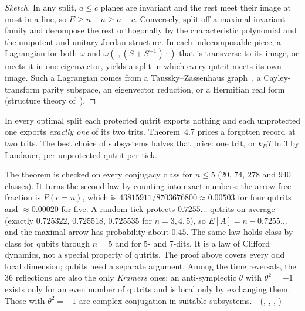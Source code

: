 \begin{proof}[Sketch]
In any split, $a\le c$ planes are invariant and the rest meet their image at most in a line, so $E\ge n-a\ge n-c$.
Conversely, split off a maximal invariant family and decompose the rest orthogonally by the characteristic polynomial
and the unipotent and unitary Jordan structure. In each indecomposable piece, a Lagrangian for both $\omega$ and
$\omega(\cdot,(S+S^{-1})\cdot)$ that is transverse to its image, or meets it in one eigenvector, yields a split in which
every qutrit meets its own image. Such a Lagrangian comes from a Taussky--Zassenhaus graph~\cite{TausskyZassenhaus1959},
a Cayley-transform parity subspace, an eigenvector reduction, or a Hermitian real form
(structure theory of~\cite{Wall1963,Milnor1969}).
\end{proof}

In every optimal split each protected qutrit exports nothing and each unprotected one exports \emph{exactly one} of its
two trits. Theorem~4.7 prices a forgotten record at two trits. The best choice of subsystems halves that price: one
trit, or $k_BT\ln3$ by Landauer, per unprotected qutrit per tick. \tierB

The theorem is checked on every conjugacy class for $n\le5$ ($20$, $74$, $278$ and $940$ classes). It turns the second law
by counting into exact numbers: the arrow-free fraction is $P(c=n)$, which is $43815911/8703676800\approx0.00503$ for
four qutrits and $\approx0.00020$ for five. A random tick protects $0.7255\ldots$ qutrits on average (exactly $0.725322$,
$0.725518$, $0.725535$ for $n=3,4,5$), so $E[A]=n-0.7255\ldots$ and the maximal arrow has probability about $0.45$. The
same law holds class by class for qubits through $n=5$ and for $5$- and $7$-dits. It is a law of Clifford dynamics, not
a special property of qutrits. The proof above covers every odd local dimension; qubits need a separate argument.
Among the time reversals, the $36$ reflections are also the only \emph{Kramers} ones: an anti-symplectic $\theta$ with
$\theta^2=-1$ exists only for an even number of qutrits and is local only by exchanging them. Those with $\theta^2=+1$
are complex conjugation in suitable subsystems. \tierT\,\tierC\ (,
, ,
)

